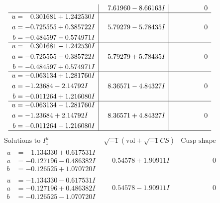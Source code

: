 \documentclass[1p]{elsarticle_modified}
\theoremstyle{definition}
\newcommand{\I}{\sqrt{-1}}
\begin{document}
$$\begin{array}{c|c|c}
 & \phantom{-}7.61960 - 8.66163 I & \phantom{-0.000000 } 0 \\ \hline\begin{aligned}
u &= \phantom{-}0.301681 + 1.242530 I \\
a &= -0.725555 + 0.385722 I \\
b &= -0.484597 - 0.574971 I\end{aligned}
 & \phantom{-}5.79279 - 5.78435 I & \phantom{-0.000000 } 0 \\ \hline\begin{aligned}
u &= \phantom{-}0.301681 - 1.242530 I \\
a &= -0.725555 - 0.385722 I \\
b &= -0.484597 + 0.574971 I\end{aligned}
 & \phantom{-}5.79279 + 5.78435 I & \phantom{-0.000000 } 0 \\ \hline\begin{aligned}
u &= -0.063134 + 1.281760 I \\
a &= -1.23684 - 2.14792 I \\
b &= -0.011264 + 1.216080 I\end{aligned}
 & \phantom{-}8.36571 - 4.84327 I & \phantom{-0.000000 } 0 \\ \hline\begin{aligned}
u &= -0.063134 - 1.281760 I \\
a &= -1.23684 + 2.14792 I \\
b &= -0.011264 - 1.216080 I\end{aligned}
 & \phantom{-}8.36571 + 4.84327 I & \phantom{-0.000000 } 0\\
 \hline 
 \end{array}$$\newpage$$\begin{array}{c|c|c}  
\text{Solutions to }I^u_{1}& \I (\text{vol} + \sqrt{-1}CS) & \text{Cusp shape}\\
 \hline 
\begin{aligned}
u &= -1.134330 + 0.617531 I \\
a &= -0.127196 - 0.486382 I \\
b &= -0.126525 + 1.070720 I\end{aligned}
 & \phantom{-}0.54578 + 1.90911 I & \phantom{-0.000000 } 0 \\ \hline\begin{aligned}
u &= -1.134330 - 0.617531 I \\
a &= -0.127196 + 0.486382 I \\
b &= -0.126525 - 1.070720 I\end{aligned}
 & \phantom{-}0.54578 - 1.90911 I & \phantom{-0.000000 } 0 \\ \hline\begin{aligned}

\end{aligned}
\end{array}$$
\end{document}
